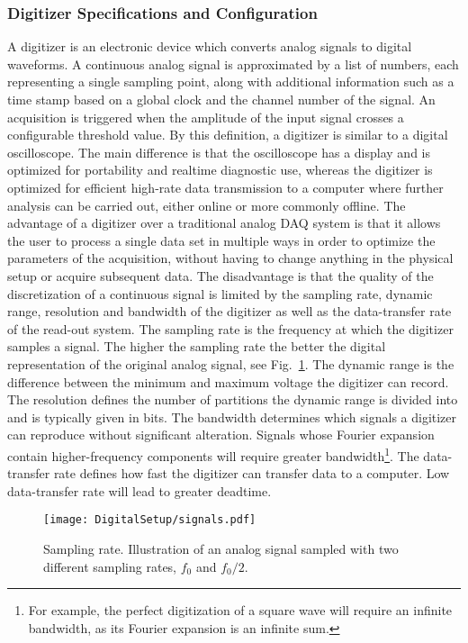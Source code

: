 \documentclass[main.tex]{subfiles}
\begin{document}
\subsubsection{Digitizer Specifications and Configuration}
A digitizer is an electronic device which converts analog signals to digital waveforms. A continuous analog signal is approximated by a list of numbers, each representing a single sampling point, along with additional information such as a time stamp based on a global clock and the channel number of the signal. An acquisition is triggered when the amplitude of the input signal crosses a configurable threshold value.
By this definition, a digitizer is similar to a digital oscilloscope. The main difference is that the oscilloscope has a display and is optimized for portability and realtime diagnostic use, whereas the digitizer is optimized for efficient high-rate data transmission to a computer where further analysis can be carried out, either online or more commonly offline.
The advantage of a digitizer over a traditional analog DAQ system is that it allows the user to process a single data set in multiple ways in order to optimize the parameters of the acquisition, without having to change anything in the physical setup or acquire subsequent data. The disadvantage is that the quality of the discretization of a continuous signal is limited by the sampling rate, dynamic range, resolution and bandwidth of the digitizer as well as the data-transfer rate of the read-out system. 
The sampling rate is the frequency at which the digitizer samples a signal. The higher the sampling rate the better the digital representation of the original analog signal, see Fig.~\ref{fig:samplingrate}.
The dynamic range is the difference between the minimum and maximum voltage the digitizer can record. The resolution defines the number of partitions the dynamic range is divided into and is typically given in bits. The bandwidth determines which signals a digitizer can reproduce without significant alteration. Signals whose Fourier expansion contain higher-frequency components will require greater bandwidth\footnote{For example, the perfect digitization of a square wave will require an infinite bandwidth, as its Fourier expansion is an infinite sum.}. The data-transfer rate defines how fast the digitizer can transfer data to a computer. Low data-transfer rate will lead to greater deadtime.

\begin{figure}[ht]
	\centering
    	\texttt{[image: DigitalSetup/signals.pdf]}
        \caption[Sampling rate.]{Sampling rate. Illustration of an analog signal sampled with two different sampling rates, $f_0$ and $f_0/2$.}
	    \label{fig:samplingrate} 
\end{figure}
\end{document}
